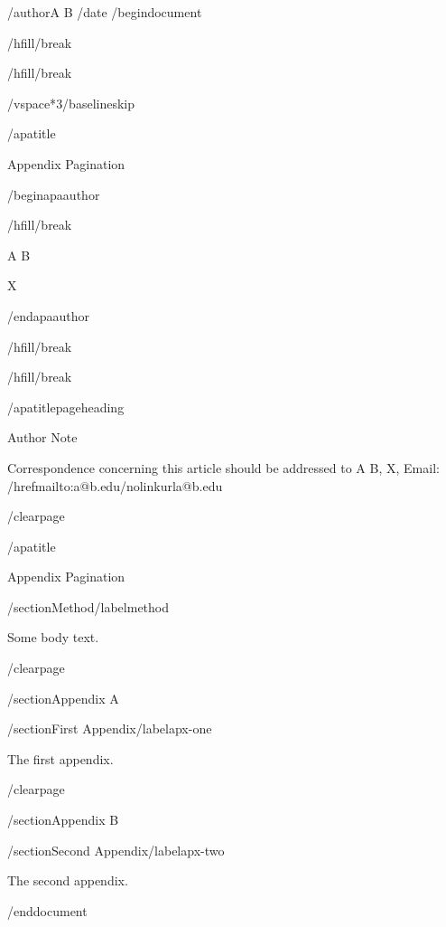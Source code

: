 /author{A B}
/date{}
/begin{document}


/hfill/break

/hfill/break

/vspace*{3/baselineskip}

/apatitle{

Appendix Pagination

}

/begin{apaauthor}

/hfill/break

A B

X

/end{apaauthor}

/hfill/break

/hfill/break

/apatitlepageheading{

Author Note

}

Correspondence concerning this article should be addressed to A
B, X, Email: /href{mailto:a@b.edu}{/nolinkurl{a@b.edu}}

/clearpage

/apatitle{

Appendix Pagination

}

/section{Method}/label{method}

Some body text.

/clearpage

/section{Appendix A}

/section{First Appendix}/label{apx-one}

The first appendix.

/clearpage

/section{Appendix B}

/section{Second Appendix}/label{apx-two}

The second appendix.




/end{document}
